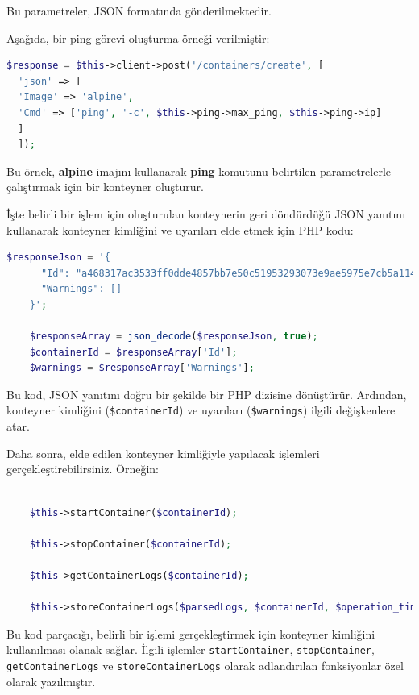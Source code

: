 Bu parametreler, JSON formatında gönderilmektedir.

Aşağıda, bir ping görevi oluşturma örneği verilmiştir:

\begin{lstlisting}[language=PHP]
  $response = $this->client->post('/containers/create', [
  'json' => [
  'Image' => 'alpine',
  'Cmd' => ['ping', '-c', $this->ping->max_ping, $this->ping->ip]
  ]
  ]);
  \end{lstlisting}

Bu örnek, \textbf{alpine} imajını kullanarak \textbf{ping} komutunu belirtilen parametrelerle çalıştırmak için bir konteyner oluşturur.


İşte belirli bir işlem için oluşturulan konteynerin geri döndürdüğü JSON yanıtını kullanarak konteyner kimliğini ve uyarıları elde etmek için PHP kodu:

\begin{lstlisting}[language=PHP]
	$responseJson = '{
	  "Id": "a468317ac3533ff0dde4857bb7e50c51953293073e9ae5975e7cb5a114b8463a",
	  "Warnings": []
	}';
	
	$responseArray = json_decode($responseJson, true);
	$containerId = $responseArray['Id'];
	$warnings = $responseArray['Warnings'];
\end{lstlisting}

Bu kod, JSON yanıtını doğru bir şekilde bir PHP dizisine dönüştürür. Ardından, konteyner kimliğini (\texttt{\$containerId}) ve uyarıları (\texttt{\$warnings}) ilgili değişkenlere atar.

Daha sonra, elde edilen konteyner kimliğiyle yapılacak işlemleri gerçekleştirebilirsiniz. Örneğin:

\begin{lstlisting}[language=PHP]
	
	$this->startContainer($containerId);
	
	$this->stopContainer($containerId);
	
	$this->getContainerLogs($containerId);
	
	$this->storeContainerLogs($parsedLogs, $containerId, $operation_time);
\end{lstlisting}

Bu kod parçacığı, belirli bir işlemi gerçekleştirmek için konteyner kimliğini kullanılması olanak sağlar. İlgili işlemler \texttt{startContainer}, \texttt{stopContainer}, \texttt{getContainerLogs} ve \texttt{storeContainerLogs} olarak adlandırılan fonksiyonlar özel olarak yazılmıştır.

